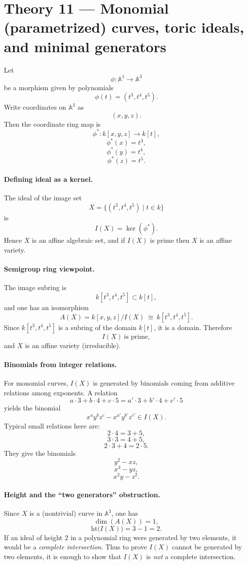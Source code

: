 \documentclass[12pt,a4paper]{article}
\theoremstyle{plain}
\theoremstyle{definition}      %
\begin{document}
\section*{Theory 11 — Monomial (parametrized) curves, toric ideals, and minimal generators}

Let
\[
\phi:\mathbb{A}^1 \longrightarrow \mathbb{A}^3
\]
be a morphism given by polynomials
\[
\phi(t)=(t^3,t^4,t^5).
\]
Write coordinates on $\mathbb{A}^3$ as
\[
(x,y,z).
\]
Then the coordinate ring map is
\[
\phi^* : k[x,y,z] \longrightarrow k[t],
\]
\[
\phi^*(x)=t^3,
\]
\[
\phi^*(y)=t^4,
\]
\[
\phi^*(z)=t^5.
\]

\paragraph{Defining ideal as a kernel.}
The ideal of the image set
\[
X=\{(t^3,t^4,t^5)\mid t\in k\}
\]
is
\[
I(X)=\ker(\phi^*).
\]
Hence $X$ is an affine algebraic set, and if $I(X)$ is prime then $X$ is an affine variety.

\paragraph{Semigroup ring viewpoint.}
The image subring is
\[
k[t^3,t^4,t^5]\subset k[t],
\]
and one has an isomorphism
\[
A(X)
=
k[x,y,z]/I(X)
\ \cong\
k[t^3,t^4,t^5].
\]
Since $k[t^3,t^4,t^5]$ is a subring of the domain $k[t]$, it is a domain.
Therefore
\[
I(X)\ \text{is prime},
\]
and $X$ is an affine variety (irreducible).

\paragraph{Binomials from integer relations.}
For monomial curves, $I(X)$ is generated by binomials coming from additive relations among exponents.
A relation
\[
a\cdot 3+b\cdot 4+c\cdot 5
=
a'\cdot 3+b'\cdot 4+c'\cdot 5
\]
yields the binomial
\[
x^{a}y^{b}z^{c}-x^{a'}y^{b'}z^{c'}
\in I(X).
\]
Typical small relations here are:
\[
2\cdot 4 = 3+5,
\]
\[
3\cdot 3 = 4+5,
\]
\[
2\cdot 3+4 = 2\cdot 5.
\]
They give the binomials
\[
y^2-xz,
\]
\[
x^3-yz,
\]
\[
x^2y-z^2.
\]

\paragraph{Height and the “two generators” obstruction.}
Since $X$ is a (nontrivial) curve in $\mathbb{A}^3$, one has
\[
\dim(A(X))=1,
\]
\[
\mathrm{ht}\bigl(I(X)\bigr)=3-1=2.
\]
If an ideal of height $2$ in a polynomial ring were generated by two elements, it would be a \emph{complete intersection}.
Thus to prove $I(X)$ cannot be generated by two elements, it is enough to show that $I(X)$ is \emph{not} a complete intersection.
\end{document}
